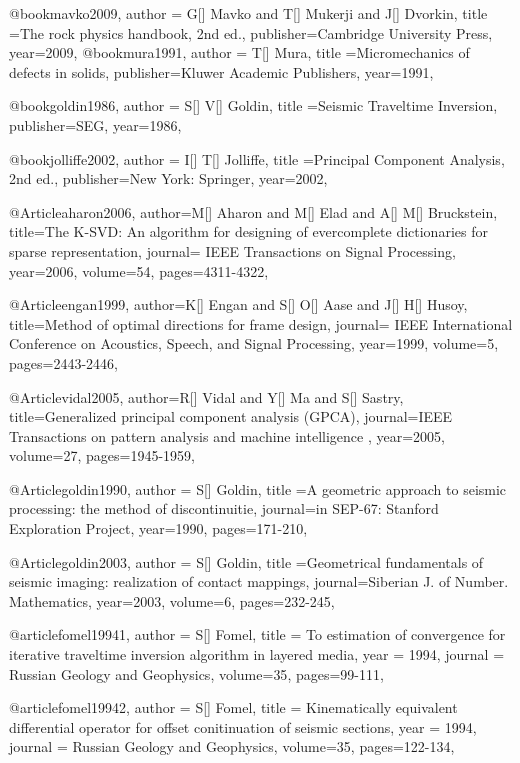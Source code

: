 @book{mavko2009,
  author = {G[] Mavko and T[] Mukerji and J[] Dvorkin},
  title ={The rock physics handbook, 2nd ed.},
  publisher={Cambridge University Press},
  year=2009,
}
@book{mura1991,
  author = {T[] Mura},
  title ={Micromechanics of defects in solids},
  publisher={Kluwer Academic Publishers},
  year=1991,
}


@book{goldin1986,
  author = {S[] V[] Goldin},
  title ={Seismic Traveltime Inversion},
  publisher={SEG},
  year=1986,
}

@book{jolliffe2002,
  author = {I[] T[] Jolliffe},
  title ={Principal Component Analysis, 2nd ed.},
  publisher={New York: Springer},
  year=2002,
}

@Article{aharon2006,
  author={M[] Aharon and M[] Elad and A[] M[] Bruckstein},
  title={The {K}-{SVD}: An algorithm for designing of evercomplete dictionaries for sparse representation},
  journal={ IEEE Transactions on Signal Processing},
  year=2006,
  volume=54,
  pages={4311-4322},
}

@Article{engan1999,
  author={K[] Engan and S[] O[] Aase and J[] H[] Husoy},
  title={Method of optimal directions for frame design},
  journal={ IEEE International Conference on Acoustics, Speech, and Signal Processing},
  year=1999,
  volume=5,
  pages={2443-2446},
}

@Article{vidal2005,
  author={R[] Vidal and Y[] Ma and S[] Sastry},
  title={Generalized principal component analysis (GPCA)},
  journal={IEEE Transactions on pattern analysis and machine intelligence
},
  year=2005,
  volume=27,
  pages={1945-1959},
}

@Article{goldin1990,
  author = {S[] Goldin},
  title ={A geometric approach to seismic processing: the method of discontinuitie},
  journal={in SEP-67: Stanford Exploration Project},
  year=1990,
  pages={171-210},
}

@Article{goldin2003,
  author = {S[] Goldin},
  title ={Geometrical fundamentals of seismic imaging: realization of contact mappings},
  journal={Siberian J. of Number. Mathematics},
  year=2003,
  volume=6,
  pages={232-245},
}

@article{fomel19941,
  author =	 {S[] Fomel},
  title =	 {To estimation of convergence for iterative traveltime inversion algorithm in layered media},
  year =	 1994,
  journal =	 {Russian Geology and Geophysics},
  volume={35},
 pages=99-111,
}

@article{fomel19942,
  author =	 {S[] Fomel},
  title =	 {Kinematically equivalent differential operator for offset conitinuation of seismic sections},
  year =	 1994,
  journal =	 {Russian Geology and Geophysics},
  volume={35},
 pages=122-134,
}

